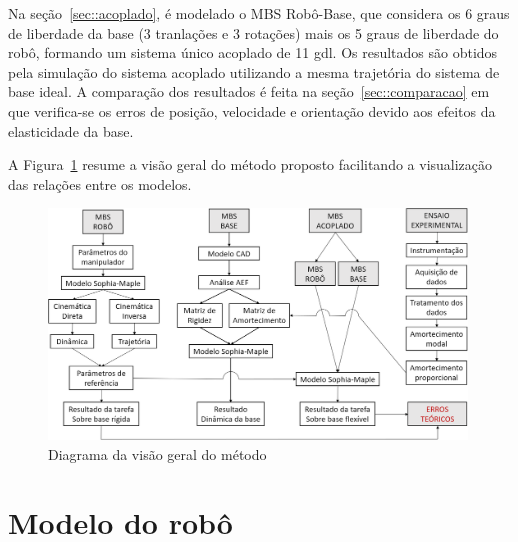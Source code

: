 Na seção~\ref{sec::acoplado}, é modelado o MBS Robô-Base, que considera os 6
graus de liberdade da base (3 tranlações e 3 rotações) mais os 5 graus de
liberdade do robô, formando um sistema único acoplado de 11 gdl. Os resultados
são obtidos pela simulação do sistema acoplado utilizando a mesma trajetória do
sistema de base ideal. A comparação dos resultados é feita na
seção~\ref{sec::comparacao} em que verifica-se os erros de posição, velocidade e
orientação devido aos efeitos da elasticidade da base.

A Figura~\ref{fig::visgeral} resume a visão geral
do método proposto facilitando a visualização das relações entre os modelos.

\begin{figure}[h]
	\centering 
 	\includegraphics[width=0.99\textwidth]{figs/visgeral}
 	\caption{Diagrama da visão geral do método}
 	\label{fig::visgeral}
\end{figure}



\section{Modelo do robô} \label{sec::robo}


